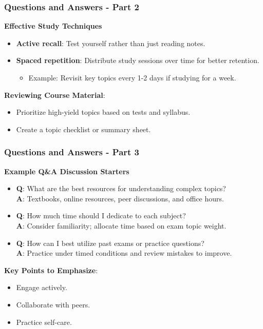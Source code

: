 \documentclass{beamer}
\begin{document}
\begin{frame}[fragile]
    \frametitle{Questions and Answers - Part 2}
    \textbf{Effective Study Techniques}
    
    \begin{itemize}
        \item \textbf{Active recall}:
            Test yourself rather than just reading notes.
        \item \textbf{Spaced repetition}:
            Distribute study sessions over time for better retention.
            \begin{itemize}
                \item Example: Revisit key topics every 1-2 days if studying for a week.
            \end{itemize}
    \end{itemize}
    
    \textbf{Reviewing Course Material}:
    \begin{itemize}
        \item Prioritize high-yield topics based on tests and syllabus.
        \item Create a topic checklist or summary sheet.
    \end{itemize}
\end{frame}

\begin{frame}[fragile]
    \frametitle{Questions and Answers - Part 3}
    \textbf{Example Q\&A Discussion Starters}
    
    \begin{itemize}
        \item \textbf{Q}: What are the best resources for understanding complex topics? \\
              \textbf{A}: Textbooks, online resources, peer discussions, and office hours.
        \item \textbf{Q}: How much time should I dedicate to each subject? \\
              \textbf{A}: Consider familiarity; allocate time based on exam topic weight.
        \item \textbf{Q}: How can I best utilize past exams or practice questions? \\
              \textbf{A}: Practice under timed conditions and review mistakes to improve.
    \end{itemize}

    \textbf{Key Points to Emphasize}:
    \begin{itemize}
        \item Engage actively.
        \item Collaborate with peers.
        \item Practice self-care.
    \end{itemize}
\end{frame}
\end{document}
